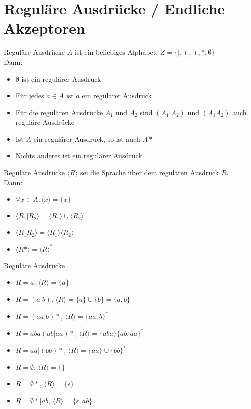 \section{Reguläre Ausdrücke / Endliche Akzeptoren}

\begin{frame}{Reguläre Ausdrücke}
  $A$ ist ein beliebiges Alphabet, $Z=\{|,(,),*,\emptyset\}$ \\
  Dann:
  \begin{itemize}
    \item $\emptyset$ ist ein regul\"arer Ausdruck
    \item F\"ur jedes $a \in A$ ist $a$ ein regul\"arer Ausdruck
    \item F\"ur die regul\"aren Ausdr\"ucke $A_{1}$ und $A_{2}$ sind $(A_{1}|A_{2})$ und $(A_{1}A_{2})$ auch regul\"are Ausdr\"ucke
    \item Ist $A$ ein regul\"arer Ausdruck, so ist auch $A*$
    \item Nichts anderes ist ein regul\"arer Ausdruck
  \end{itemize}
\end{frame}

\begin{frame}{Reguläre Ausdrücke}
  $\langle R \rangle$ sei die Sprache über dem regulären Ausdruck $R$. \\
  Dann:
  \begin{itemize}
    \item $\forall x\in A: \langle x \rangle = \{x\}$
    \item $\langle R_1 | R_2 \rangle = \langle R_1 \rangle \cup \langle R_2 \rangle$
    \item $\langle R_1R_2\rangle = \langle R_1 \rangle \langle R_2 \rangle$
    \item $\langle R*\rangle = \langle R \rangle ^*$
  \end{itemize}
\end{frame}

\begin{frame}{Reguläre Ausdrücke}
  \begin{itemize}
    \item $R=a$, $\langle R\rangle = \{a\}$
    \pause
    \item $R=(a|b)$, $\langle R\rangle = \{a\}\cup\{b\}= \{a,b\}$
    \pause
    \item $R=(aa|b)*$, $\langle R\rangle = \{aa,b\}^*$
    \pause
    \item $R=aba(ab|aa)*$, $\langle R\rangle = \{aba\}\{ab,aa\}^*$
    \pause
    \item $R=aa|(bb)*$, $\langle R\rangle = \{aa\}\cup\{bb\}^*$
    \pause
    \item $R=\emptyset$, $\langle R\rangle = \{\}$
    \pause
    \item $R=\emptyset *$, $\langle R\rangle = \{\epsilon\}$
    \pause
    \item  $R=\emptyset *|ab$, $\langle R\rangle = \{\epsilon ,ab\}$
  \end{itemize}
\end{frame}

